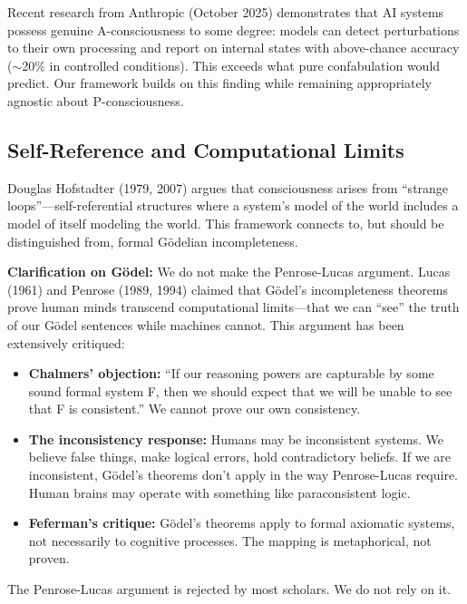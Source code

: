 \documentclass[12pt,a4paper]{article}
\begin{document}
Recent research from Anthropic (October 2025) demonstrates that AI systems possess genuine A-consciousness to some degree: models can detect perturbations to their own processing and report on internal states with above-chance accuracy ($\sim$20\% in controlled conditions). This exceeds what pure confabulation would predict. Our framework builds on this finding while remaining appropriately agnostic about P-consciousness.

\subsection{Self-Reference and Computational Limits}

Douglas Hofstadter (1979, 2007) argues that consciousness arises from ``strange loops''---self-referential structures where a system's model of the world includes a model of itself modeling the world. This framework connects to, but should be distinguished from, formal G\"{o}delian incompleteness.

\textbf{Clarification on G\"{o}del:} We do not make the Penrose-Lucas argument. Lucas (1961) and Penrose (1989, 1994) claimed that G\"{o}del's incompleteness theorems prove human minds transcend computational limits---that we can ``see'' the truth of our G\"{o}del sentences while machines cannot. This argument has been extensively critiqued:

\begin{itemize}
    \item \textbf{Chalmers' objection:} ``If our reasoning powers are capturable by some sound formal system F, then we should expect that we will be unable to see that F is consistent.'' We cannot prove our own consistency.

    \item \textbf{The inconsistency response:} Humans may be inconsistent systems. We believe false things, make logical errors, hold contradictory beliefs. If we are inconsistent, G\"{o}del's theorems don't apply in the way Penrose-Lucas require. Human brains may operate with something like paraconsistent logic.

    \item \textbf{Feferman's critique:} G\"{o}del's theorems apply to formal axiomatic systems, not necessarily to cognitive processes. The mapping is metaphorical, not proven.
\end{itemize}

The Penrose-Lucas argument is rejected by most scholars. We do not rely on it.
\end{document}
